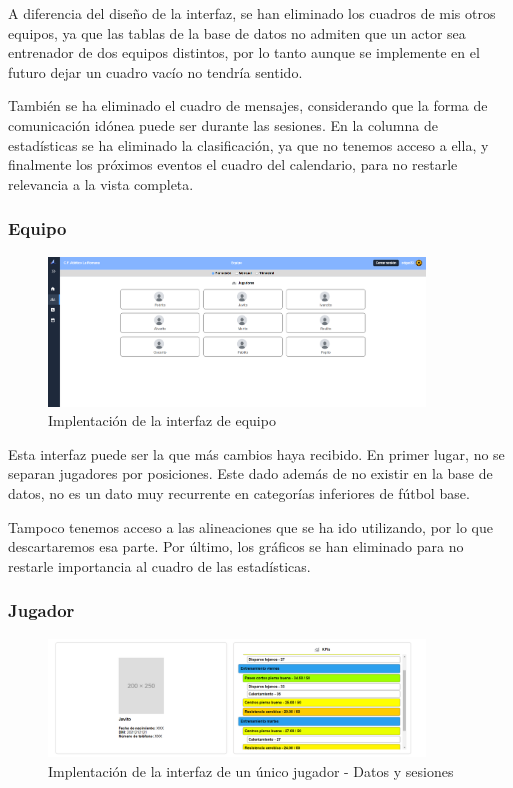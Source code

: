 A diferencia del diseño de la interfaz, se han eliminado los cuadros de mis otros equipos, ya que las tablas de la base de datos no admiten que un actor sea entrenador de dos equipos distintos, por lo tanto aunque se implemente en el futuro dejar un cuadro vacío no tendría sentido.

También se ha eliminado el cuadro de mensajes, considerando que la forma de comunicación idónea puede ser durante las sesiones. En la columna de estadísticas se ha eliminado la clasificación, ya que no tenemos acceso a ella, y finalmente los próximos eventos el cuadro del calendario, para no restarle relevancia a la vista completa.
\subsubsection{Equipo}
\begin{figure}[H]
    \centering
    \includegraphics[width=10cm]{archivos/tfg_jorge/interfaces/equipo}
    \caption{Implentación de la interfaz de equipo}\label{sistemass2}
\end{figure}

Esta interfaz puede ser la que más cambios haya recibido. En primer lugar, no se separan jugadores por posiciones. Este dado además de no existir en la base de datos, no es un dato muy recurrente en categorías inferiores de fútbol base.

Tampoco tenemos acceso a las alineaciones que se ha ido utilizando, por lo que descartaremos esa parte. Por último, los gráficos se han eliminado para no restarle importancia al cuadro de las estadísticas.
\subsubsection{Jugador}
\begin{figure}[H]
    \centering
    \includegraphics[width=10cm]{archivos/tfg_jorge/interfaces/jugador_1}
    \caption{Implentación de la interfaz de un único jugador - Datos y sesiones}\label{sistemass2}
\end{figure}

